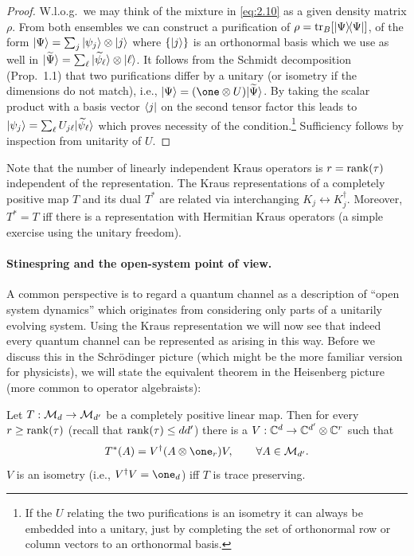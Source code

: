 \documentclass[11pt,a4paper]{article}
\numberwithin{equation}{section}
\theoremstyle{plain}
\theoremstyle{definition}
\begin{document}
\begin{proof}
    W.l.o.g.\ we may think of the mixture in \eqref{eq:2.10} as a given density matrix
    $\rho$. From both ensembles we can construct a purification of
    $\rho=\operatorname{tr}_B[|\Psi\rangle\!\langle\Psi|]$, of the form
    $|\Psi\rangle=\sum_j |\psi_j\rangle\otimes |j\rangle$ where $\{|j\rangle\}$ is an orthonormal
    basis which we use as well in
    $|\widetilde{\Psi}\rangle=\sum_\ell |\widetilde{\psi}_\ell\rangle\otimes |\ell\rangle$.
    It follows from the Schmidt decomposition (Prop.~1.1) that two purifications differ
    by a unitary (or isometry if the dimensions do not match), i.e.,
    $\ket{\Psi}=(\one\otimes U)\ket{\widetilde{\Psi}}$. By taking the scalar product
    with a basis vector $\langle j|$ on the second tensor factor this leads to
    $|\psi_j\rangle=\sum_\ell U_{j\ell}|\widetilde{\psi}_\ell\rangle$ which proves necessity
    of the condition.\footnote{If the $U$ relating the two purifications is an isometry
        it can always be embedded into a unitary, just by completing the set of orthonormal
        row or column vectors to an orthonormal basis.} Sufficiency follows by inspection
    from unitarity of $U$.
\end{proof}

Note that the number of linearly independent Kraus operators is $r=\operatorname{rank}(\tau)$
independent of the representation. The Kraus representations of a completely
positive map $T$ and its dual $T^*$ are related via interchanging
$K_j \leftrightarrow K_j^\dagger$. Moreover, $T^* = T$ iff there is a
representation with Hermitian Kraus operators (a simple exercise using the unitary
freedom).

\paragraph{Stinespring and the open-system point of view.}
A common perspective is to regard a quantum channel as a description of
``open system dynamics'' which originates from considering only parts of a unitarily
evolving system. Using the Kraus representation we will now see that indeed every
quantum channel can be represented as arising in this way. Before we discuss this
in the Schr\"odinger picture (which might be the more familiar version for
physicists), we will state the equivalent theorem in the Heisenberg picture (more
common to operator algebraists):

\begin{theorem}
    Let $T:\mathcal{M}_d \to \mathcal{M}_{d'}$ be a completely positive linear map. Then for every
    $r \ge \operatorname{rank}(\tau)$ (recall that $\operatorname{rank}(\tau)\le dd'$) there is a
    $V:\mathbb{C}^d \to \mathbb{C}^{d'} \otimes \mathbb{C}^r$ such that
    \begin{equation}\label{eq:2.11}
        T^*(A) = V^\dagger (A \otimes \one_r)V, \qquad \forall A \in \mcM_{d'}.
    \end{equation}
    $V$ is an isometry (i.e., $V^\dagger V = \one_d$) iff $T$ is trace preserving.
\end{theorem}
\end{document}
